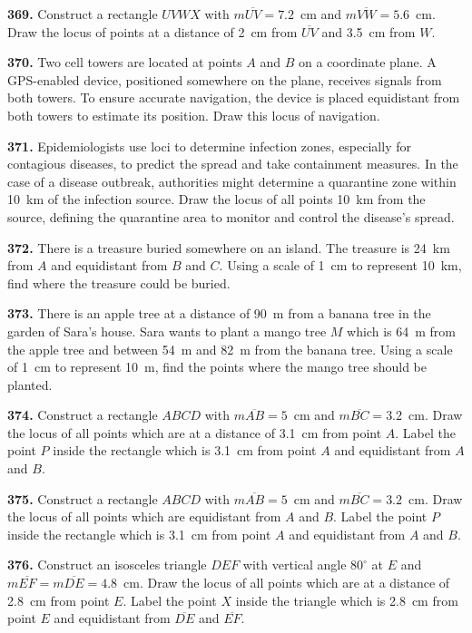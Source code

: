 \documentclass[11pt]{article}
\begin{document}
\bigskip
\noindent\textbf{369.} Construct a rectangle $UVWX$ with $m\overline{UV}=7.2$~cm and $m\overline{VW}=5.6$~cm. Draw the locus of points at a distance of 2~cm from $\overline{UV}$ and 3.5~cm from $W$.

\bigskip
\noindent\textbf{370.} Two cell towers are located at points $A$ and $B$ on a coordinate plane. A GPS-enabled device, positioned somewhere on the plane, receives signals from both towers. To ensure accurate navigation, the device is placed equidistant from both towers to estimate its position. Draw this locus of navigation.

\bigskip
\noindent\textbf{371.} Epidemiologists use loci to determine infection zones, especially for contagious diseases, to predict the spread and take containment measures. In the case of a disease outbreak, authorities might determine a quarantine zone within 10~km of the infection source. Draw the locus of all points 10~km from the source, defining the quarantine area to monitor and control the disease's spread.

\bigskip
\noindent\textbf{372.} There is a treasure buried somewhere on an island. The treasure is 24~km from $A$ and equidistant from $B$ and $C$. Using a scale of 1~cm to represent 10~km, find where the treasure could be buried.

\bigskip
\noindent\textbf{373.} There is an apple tree at a distance of 90~m from a banana tree in the garden of Sara's house. Sara wants to plant a mango tree $M$ which is 64~m from the apple tree and between 54~m and 82~m from the banana tree. Using a scale of 1~cm to represent 10~m, find the points where the mango tree should be planted.

\bigskip
\noindent\textbf{374.} Construct a rectangle $ABCD$ with $m\overline{AB}=5$~cm and $m\overline{BC}=3.2$~cm. Draw the locus of all points which are at a distance of 3.1~cm from point $A$. Label the point $P$ inside the rectangle which is 3.1~cm from point $A$ and equidistant from $A$ and $B$.

\bigskip
\noindent\textbf{375.} Construct a rectangle $ABCD$ with $m\overline{AB}=5$~cm and $m\overline{BC}=3.2$~cm. Draw the locus of all points which are equidistant from $A$ and $B$. Label the point $P$ inside the rectangle which is 3.1~cm from point $A$ and equidistant from $A$ and $B$.

\bigskip
\noindent\textbf{376.} Construct an isosceles triangle $DEF$ with vertical angle $80^{\circ}$ at $E$ and $m\overline{EF}=m\overline{DE}=4.8$~cm. Draw the locus of all points which are at a distance of 2.8~cm from point $E$. Label the point $X$ inside the triangle which is 2.8~cm from point $E$ and equidistant from $\overline{DE}$ and $\overline{EF}$.
\end{document}
